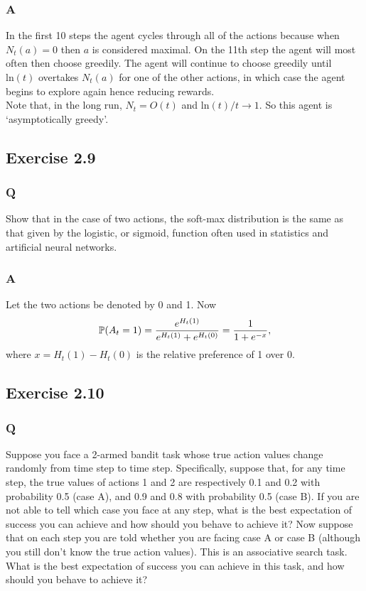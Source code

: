 \subsubsection{A}
In the first 10 steps the agent cycles through all of the actions because when $N_t(a) = 0$ then $a$ is considered maximal. On the 11th step the agent will most often then choose greedily. The agent will continue to choose greedily until $\mathrm{ln}(t)$ overtakes $N_t(a)$ for one of the other actions, in which case the agent begins to explore again hence reducing rewards.\\

Note that, in the long run, $N_t = O(t)$ and $\mathrm{ln}(t) / t \to 1$. So this agent is `asymptotically greedy'.


\subsection{Exercise 2.9}
\subsubsection{Q}
Show that in the case of two actions, the soft-max distribution is the same as that given by the logistic, or sigmoid, function often used in statistics and artificial neural networks.

\subsubsection{A}
Let the two actions be denoted by 0 and 1. Now
\begin{equation}
    \P{}(A_t = 1) = \frac{e^{H_t(1)}}{e^{H_t(1)} + e^{H_t(0)}} = \frac{1}{1 + e^{-x}}, 
\end{equation}
where $x = H_t(1) - H_t(0)$ is the relative preference of 1 over 0.

\subsection{Exercise 2.10}
\subsubsection{Q}
Suppose you face a 2-armed bandit task whose true action values change randomly from time step to time step. Specifically, suppose that, for any time step, the true values of actions 1 and 2 are respectively 0.1 and 0.2 with probability 0.5 (case A), and 0.9 and 0.8 with probability 0.5 (case B). If you are not able to tell which case you face at any step, what is the best expectation of success you can achieve and how should you behave to achieve it? Now suppose that on each step you are told whether you are facing case A or case B (although you still don’t know the true action values). This is an associative search task. What is the best expectation of success you can achieve in this task, and how should you behave to achieve it?

